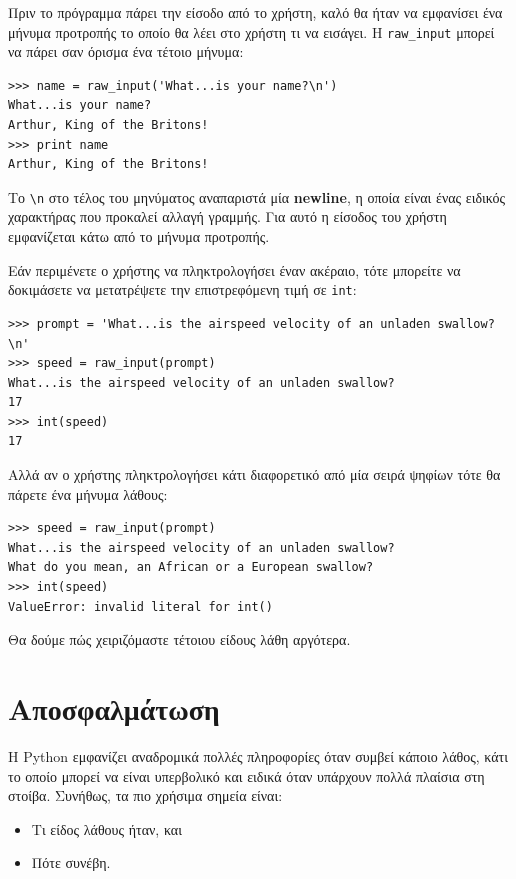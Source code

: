 \documentclass[10pt]{book}
\begin{document}
Πριν το πρόγραμμα πάρει την είσοδο από το χρήστη, καλό θα ήταν να εμφανίσει ένα μήνυμα προτροπής το οποίο θα λέει στο χρήστη τι να εισάγει. Η \verb"raw_input" μπορεί να πάρει σαν όρισμα ένα τέτοιο μήνυμα:

\begin{verbatim}
>>> name = raw_input('What...is your name?\n')
What...is your name?
Arthur, King of the Britons!
>>> print name
Arthur, King of the Britons!
\end{verbatim}
%

Το \verb"\n" στο τέλος του μηνύματος αναπαριστά μία {\bf newline},
η οποία είναι ένας ειδικός χαρακτήρας που προκαλεί αλλαγή γραμμής.
Για αυτό η είσοδος του χρήστη εμφανίζεται κάτω από το μήνυμα προτροπής.

Εάν περιμένετε ο χρήστης να πληκτρολογήσει έναν ακέραιο, τότε μπορείτε να δοκιμάσετε να μετατρέψετε την επιστρεφόμενη τιμή σε {\tt int}:

\begin{verbatim}
>>> prompt = 'What...is the airspeed velocity of an unladen swallow?\n'
>>> speed = raw_input(prompt)
What...is the airspeed velocity of an unladen swallow?
17
>>> int(speed)
17
\end{verbatim}
%

Αλλά αν ο χρήστης πληκτρολογήσει κάτι διαφορετικό από μία σειρά ψηφίων τότε θα
πάρετε ένα μήνυμα λάθους:

\begin{verbatim}
>>> speed = raw_input(prompt)
What...is the airspeed velocity of an unladen swallow?
What do you mean, an African or a European swallow?
>>> int(speed)
ValueError: invalid literal for int()
\end{verbatim}
%

Θα δούμε πώς χειριζόμαστε τέτοιου είδους λάθη αργότερα.


\section{Αποσφαλμάτωση}
\label{whitespace}

Η Python εμφανίζει αναδρομικά πολλές πληροφορίες όταν συμβεί κάποιο λάθος,
κάτι το οποίο μπορεί να είναι υπερβολικό και ειδικά όταν υπάρχουν πολλά πλαίσια στη στοίβα. Συνήθως, τα πιο χρήσιμα σημεία είναι:

\begin{itemize}

\item Τι είδος λάθους ήταν, και 

\item Πότε συνέβη.

\end{itemize}
\end{document}
